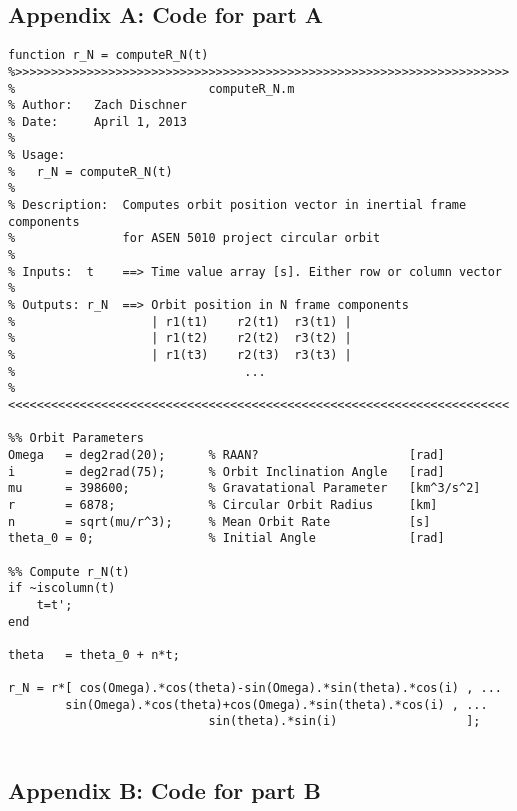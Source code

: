 \documentclass[11pt]{aiaa-tc}%
\begin{document}
\subsection{Appendix A: Code for part A}
\label{APP:Code for Part A}
\begin{lstlisting}
function r_N = computeR_N(t)
%>>>>>>>>>>>>>>>>>>>>>>>>>>>>>>>>>>>>>>>>>>>>>>>>>>>>>>>>>>>>>>>>>>>>> 
%                           computeR_N.m
% Author:   Zach Dischner
% Date:     April 1, 2013
% 
% Usage:
%   r_N = computeR_N(t)
%
% Description:  Computes orbit position vector in inertial frame components
%               for ASEN 5010 project circular orbit
% 
% Inputs:  t    ==> Time value array [s]. Either row or column vector
%
% Outputs: r_N  ==> Orbit position in N frame components
%                   | r1(t1)    r2(t1)  r3(t1) |
%                   | r1(t2)    r2(t2)  r3(t2) |
%                   | r1(t3)    r2(t3)  r3(t3) |
%                                ...
%<<<<<<<<<<<<<<<<<<<<<<<<<<<<<<<<<<<<<<<<<<<<<<<<<<<<<<<<<<<<<<<<<<<<<<

%% Orbit Parameters
Omega   = deg2rad(20);      % RAAN?                     [rad]
i       = deg2rad(75);      % Orbit Inclination Angle   [rad]
mu      = 398600;           % Gravatational Parameter   [km^3/s^2]
r       = 6878;             % Circular Orbit Radius     [km]
n       = sqrt(mu/r^3);     % Mean Orbit Rate           [s]
theta_0 = 0;                % Initial Angle             [rad]

%% Compute r_N(t)
if ~iscolumn(t)
    t=t';
end

theta   = theta_0 + n*t;

r_N = r*[ cos(Omega).*cos(theta)-sin(Omega).*sin(theta).*cos(i) , ...
        sin(Omega).*cos(theta)+cos(Omega).*sin(theta).*cos(i) , ...
                            sin(theta).*sin(i)                  ];
        
\end{lstlisting}




\subsection{Appendix B: Code for part B}
\end{document}

